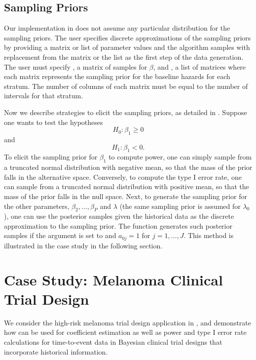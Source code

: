 \subsection{Sampling Priors}\label{sampling_priors}
Our implementation in  does not assume any particular distribution for the sampling
priors. The user specifies discrete approximations of the sampling priors by providing a matrix or list of parameter values and the algorithm samples with replacement from the matrix or the list as the first step of the data generation. The user must specify , a matrix of samples for $\beta$, and , a list of matrices where each matrix represents the sampling prior for the baseline hazards for each stratum. The number of columns of each matrix must be equal to the number of intervals for that stratum. 

Now we describe strategies to elicit the sampling priors, as detailed in \cite{Psioda_Ibrahim_2019}. Suppose one wants to test the hypotheses $$H_0: \beta_1 \ge 0$$ and $$H_1: \beta_1 < 0.$$ To elicit the sampling prior for $\beta_1$ to compute power, one can simply sample from a truncated normal distribution with negative mean, so that the mass of the prior falls in the alternative space. Conversely, to compute the type I error rate, one can  sample from a truncated normal distribution with positive mean, so that the mass of the prior falls in the null space. Next, to generate the sampling prior for the other parameters, $\beta_2, \dots, \beta_P$ and $\lambda$ (the same sampling prior is assumed for $\lambda_0$), one can use the posterior samples given the historical data as the discrete approximation to the sampling prior. The function  generates such posterior samples if the  argument is set to  and $a_{0j}=1$ for $j=1,\dots,J$. This method is illustrated in the case study in the following section. 

\section{Case Study: Melanoma Clinical Trial Design}\label{melanoma}

We consider the high-risk melanoma trial design application in \cite{Psioda_Ibrahim_2019}, and demonstrate how  can be used for coefficient estimation as well as power and type I error rate calculations for time-to-event data in Bayesian clinical trial designs that incorporate historical information. 

